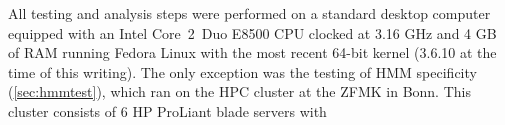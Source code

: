 All testing and analysis steps were performed on a standard desktop computer
equipped with an Intel \mbox{Core 2 Duo} E8500 CPU clocked at 3.16 GHz and 4 GB
of RAM running Fedora Linux with the most recent 64-bit kernel (3.6.10 at the
time of this writing). The only exception was the testing of HMM specificity
(\ref{sec:hmmtest}), which ran on the HPC cluster at the ZFMK in Bonn. This
cluster consists of 6 HP ProLiant blade servers with 
